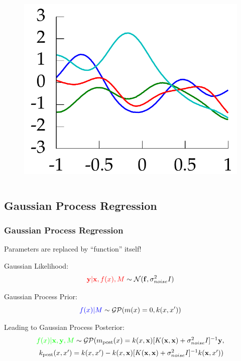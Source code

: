 \documentclass[10pt]{beamer}
\newcommand{\bx}{\mathbf{x}}
\newcommand{\by}{\mathbf{y}}
\newcommand{\boldf}{\mathbf{f}}
\newcommand{\gp}{\mathcal{GP}}
\newcommand{\gaussN}{\mathcal{N}}
\begin{document}
\begin{frame}
\begin{columns}
      \begin{column}{0.45\textwidth}
        \begin{figure}
          \centering
          \includegraphics[width=\textwidth]{samplePaths.png}
        \end{figure}
      \end{column}
    \end{columns}
  \end{frame}

  \subsection{Gaussian Process Regression}

  \begin{frame}
    \frametitle{Gaussian Process Regression}
    Parameters are replaced by ``function'' itself!

    Gaussian Likelihood:
      \begin{equation*}
        \textcolor{red}{\by|\bx,f(x),M} \sim \gaussN(\boldf, \sigma^2_{noise}I)
      \end{equation*}

    Gaussian Process Prior:
      \begin{equation*}
        \textcolor{blue}{f(x)|M} \sim \gp(m(x) = 0, k(x,x'))
      \end{equation*}

    Leading to Gaussian Process Posterior:
      \begin{equation*}
        \begin{array}{c}
          \textcolor{green}{f(x)|\bx,\by,M} \sim \gp ( m_{\text{post}}(x) = k(x,\bx)[K(\bx,\bx) + \sigma^2_{noise}I]^{-1} \by, \\[0.2cm]
          \; k_{\text{post}}(x,x') =  k(x,x') - k(x,\bx)[K(\bx,\bx) + \sigma^2_{noise}I]^{-1} k(\bx,x') )
        \end{array}
      \end{equation*}
    \end{frame}
\end{document}
